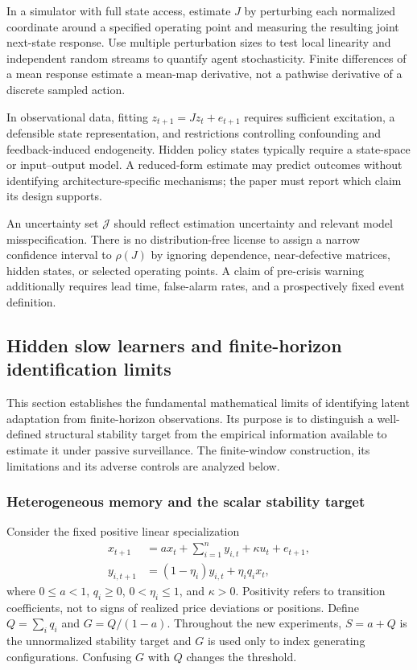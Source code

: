 \documentclass[10pt,twocolumn,letterpaper]{article}
\theoremstyle{definition}
\theoremstyle{remark}
\begin{document}
In a simulator with full state access, estimate $J$ by perturbing each normalized coordinate around a specified operating point and measuring the resulting joint next-state response. Use multiple perturbation sizes to test local linearity and independent random streams to quantify agent stochasticity. Finite differences of a mean response estimate a mean-map derivative, not a pathwise derivative of a discrete sampled action.

In observational data, fitting $z_{t+1}=Jz_t+e_{t+1}$ requires sufficient excitation, a defensible state representation, and restrictions controlling confounding and feedback-induced endogeneity. Hidden policy states typically require a state-space or input--output model. A reduced-form estimate may predict outcomes without identifying architecture-specific mechanisms; the paper must report which claim its design supports.

An uncertainty set $\mathcal J$ should reflect estimation uncertainty and relevant model misspecification. There is no distribution-free license to assign a narrow confidence interval to $\rho(J)$ by ignoring dependence, near-defective matrices, hidden states, or selected operating points. A claim of pre-crisis warning additionally requires lead time, false-alarm rates, and a prospectively fixed event definition.

\subsection{Hidden slow learners and finite-horizon identification limits}
\label{sec:integrated_hidden}
This section establishes the fundamental mathematical limits of identifying latent adaptation from finite-horizon observations. Its purpose is to distinguish a well-defined structural stability target from the empirical information available to estimate it under passive surveillance. The finite-window construction, its limitations and its adverse controls are analyzed below.

\subsubsection{Heterogeneous memory and the scalar stability target}
Consider the fixed positive linear specialization
\begin{align}
 x_{t+1}&=a x_t+\sum_{i=1}^n y_{i,t}+\kappa u_t+e_{t+1},\\
 y_{i,t+1}&=(1-\eta_i)y_{i,t}+\eta_i q_i x_t,
 \label{eq:heterogeneous}
\end{align}
where $0\le a<1$, $q_i\ge0$, $0<\eta_i\le1$, and $\kappa>0$. Positivity refers to transition coefficients, not to signs of realized price deviations or positions. Define $Q=\sum_iq_i$ and $G=Q/(1-a)$. Throughout the new experiments, $S=a+Q$ is the unnormalized stability target and $G$ is used only to index generating configurations. Confusing $G$ with $Q$ changes the threshold.
\end{document}
